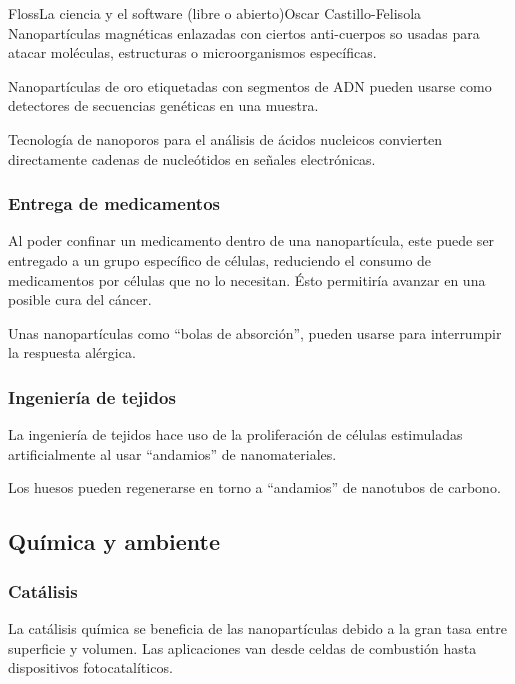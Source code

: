 \begin{article}[2]{Floss}{La ciencia y el software (libre o abierto)}{Oscar Castillo-Felisola}
Nanopart\'iculas magn\'eticas enlazadas con ciertos anti-cuerpos so usadas para atacar mol\'eculas, estructuras o microorganismos  espec\'ificas.

Nanopart\'iculas de oro etiquetadas con segmentos de ADN pueden usarse como detectores de secuencias gen\'eticas en una muestra.

Tecnolog\'ia de nanoporos para el an\'alisis de \'acidos nucleicos convierten directamente cadenas de nucle\'otidos en se\~nales electr\'onicas.

\subsubsection*{Entrega de medicamentos}

Al poder confinar un medicamento dentro de una nanopart\'icula, este puede ser entregado a un grupo espec\'ifico de c\'elulas, reduciendo el consumo de medicamentos por c\'elulas que no lo necesitan. \'Esto permitir\'ia avanzar en una posible %
cura del c\'ancer.

Unas nanopart\'iculas como ``bolas de absorci\'on'', pueden usarse para interrumpir la respuesta al\'ergica. 


\subsubsection*{Ingenier\'ia de tejidos}

La ingenier\'ia de tejidos hace uso de la proliferaci\'on de c\'elulas estimuladas artificialmente al usar ``andamios'' de nanomateriales.

Los huesos pueden regenerarse en torno a ``andamios'' de nanotubos de carbono.

\subsection{Qu\'imica y ambiente}

\subsubsection*{Cat\'alisis}

La cat\'alisis qu\'imica se beneficia de las nanopart\'iculas debido a la gran tasa entre superficie y volumen. Las aplicaciones van desde celdas de combusti\'on hasta dispositivos fotocatal\'iticos.


\end{article}
